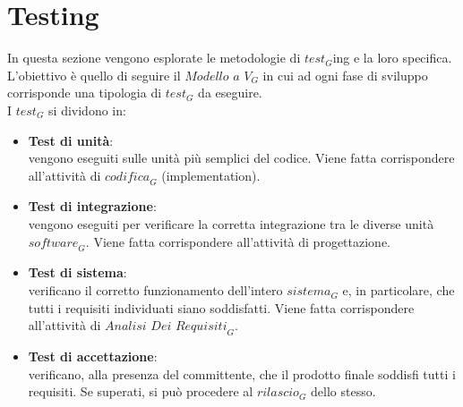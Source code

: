 

\section{Testing}
In questa sezione vengono esplorate le metodologie di $\textit{test}_G$ing e la loro specifica. L'obiettivo è quello di seguire il $\textit{Modello a V}_G$ in cui ad ogni fase di sviluppo corrisponde una tipologia di $\textit{test}_G$ da eseguire.\\
I $\textit{test}_G$ si dividono in:
\begin{itemize}
    \item \textbf{Test di unità}:\\
    vengono eseguiti sulle unità più semplici del codice. Viene fatta corrispondere all'attività di $\textit{codifica}_G$ (implementation).
    \item \textbf{Test di integrazione}:\\
    vengono eseguiti per verificare la corretta integrazione tra le diverse unità $\textit{software}_G$. Viene fatta corrispondere all'attività di progettazione.
    \item \textbf{Test di sistema}:\\
    verificano il corretto funzionamento dell'intero $\textit{sistema}_G$ e, in particolare, che tutti i requisiti individuati siano soddisfatti. Viene fatta corrispondere all'attività di $\textit{Analisi Dei Requisiti}_G$. 
    \item \textbf{Test di accettazione}:\\
    verificano, alla presenza del committente, che il prodotto finale soddisfi tutti i requisiti. Se superati, si può procedere al $\textit{rilascio}_G$ dello stesso.
\end{itemize}

